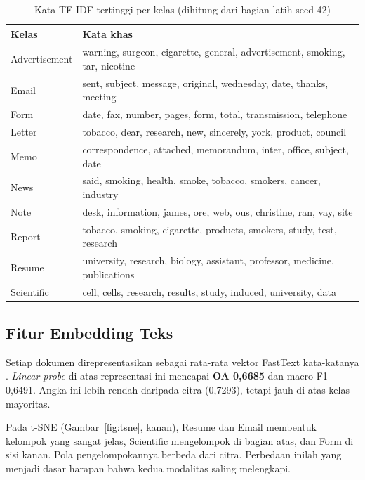 \begin{table}[H]
  \centering
  \caption{Kata TF-IDF tertinggi per kelas (dihitung dari bagian latih seed 42)}
  \label{tab:tfidf}
  \fontsize{10}{12}\selectfont
  \begin{tabularx}{\textwidth}{|l|>{\raggedright\arraybackslash}X|}
    \hline
    \textbf{Kelas} & \textbf{Kata khas} \\ \hline
    Advertisement & warning, surgeon, cigarette, general, advertisement, smoking, tar, nicotine \\ \hline
    Email & sent, subject, message, original, wednesday, date, thanks, meeting \\ \hline
    Form & date, fax, number, pages, form, total, transmission, telephone \\ \hline
    Letter & tobacco, dear, research, new, sincerely, york, product, council \\ \hline
    Memo & correspondence, attached, memorandum, inter, office, subject, date \\ \hline
    News & said, smoking, health, smoke, tobacco, smokers, cancer, industry \\ \hline
    Note & desk, information, james, ore, web, ous, christine, ran, vay, site \\ \hline
    Report & tobacco, smoking, cigarette, products, smokers, study, test, research \\ \hline
    Resume & university, research, biology, assistant, professor, medicine, publications \\ \hline
    Scientific & cell, cells, research, results, study, induced, university, data \\ \hline
  \end{tabularx}
\end{table}

\subsection{Fitur Embedding Teks}

Setiap dokumen direpresentasikan sebagai rata-rata vektor FastText kata-katanya
\parencite{bojanowski2017}. \textit{Linear probe} di atas representasi ini mencapai
\textbf{OA 0,6685} dan macro F1 0,6491. Angka ini lebih rendah daripada citra (0,7293),
tetapi jauh di atas kelas mayoritas.

Pada t-SNE (Gambar~\ref{fig:tsne}, kanan), Resume dan Email membentuk kelompok yang
sangat jelas, Scientific mengelompok di bagian atas, dan Form di sisi kanan. Pola
pengelompokannya berbeda dari citra. Perbedaan inilah yang menjadi dasar harapan bahwa
kedua modalitas saling melengkapi.

